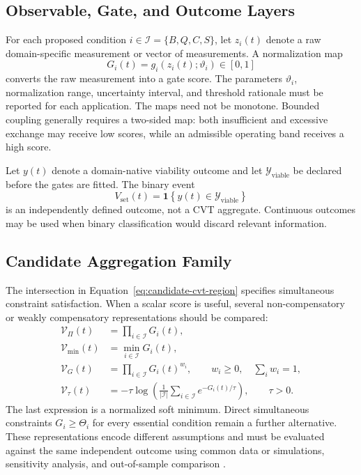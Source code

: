 \documentclass[11pt]{article}
\newcommand{\V}{\mathcal{V}}
\begin{document}
\subsection{Observable, Gate, and Outcome Layers}

For each proposed condition \(i\in\mathcal I=\{B,Q,C,S\}\), let \(z_i(t)\) denote a raw domain-specific measurement or vector of measurements. A normalization map
\begin{equation}
    G_i(t)
    =
    g_i\!\left(z_i(t);\vartheta_i\right)
    \in[0,1]
    \label{eq:gate-normalization}
\end{equation}
converts the raw measurement into a gate score. The parameters \(\vartheta_i\), normalization range, uncertainty interval, and threshold rationale must be reported for each application. The maps need not be monotone. Bounded coupling generally requires a two-sided map: both insufficient and excessive exchange may receive low scores, while an admissible operating band receives a high score.

Let \(y(t)\) denote a domain-native viability outcome and let \(\mathcal Y_{\mathrm{viable}}\) be declared before the gates are fitted. The binary event
\begin{equation}
    V_{\mathrm{set}}(t)
    =
    \mathbf{1}\!\left\{y(t)\in\mathcal Y_{\mathrm{viable}}\right\}
    \label{eq:independent-viability-event}
\end{equation}
is an independently defined outcome, not a CVT aggregate. Continuous outcomes may be used when binary classification would discard relevant information.

\subsection{Candidate Aggregation Family}

The intersection in Equation~\eqref{eq:candidate-cvt-region} specifies simultaneous constraint satisfaction. When a scalar score is useful, several non-compensatory or weakly compensatory representations should be compared:
\begin{align}
    \V_{\Pi}(t)
    &=
    \prod_{i\in\mathcal I}G_i(t),
    \\
    \V_{\min}(t)
    &=
    \min_{i\in\mathcal I}G_i(t),
    \\
    \V_G(t)
    &=
    \prod_{i\in\mathcal I}G_i(t)^{w_i},
    \qquad
    w_i\geq0,
    \quad
    \sum_iw_i=1,
    \\
    \V_{\tau}(t)
    &=
    -\tau\log\!\left(
        \frac{1}{|\mathcal I|}
        \sum_{i\in\mathcal I}e^{-G_i(t)/\tau}
    \right),
    \qquad \tau>0.
    \label{eq:aggregation-family}
\end{align}
The last expression is a normalized soft minimum. Direct simultaneous constraints \(G_i\geq\Theta_i\) for every essential condition remain a further alternative. These representations encode different assumptions and must be evaluated against the same independent outcome using common data or simulations, sensitivity analysis, and out-of-sample comparison \cite{oecd2008}.
\end{document}
